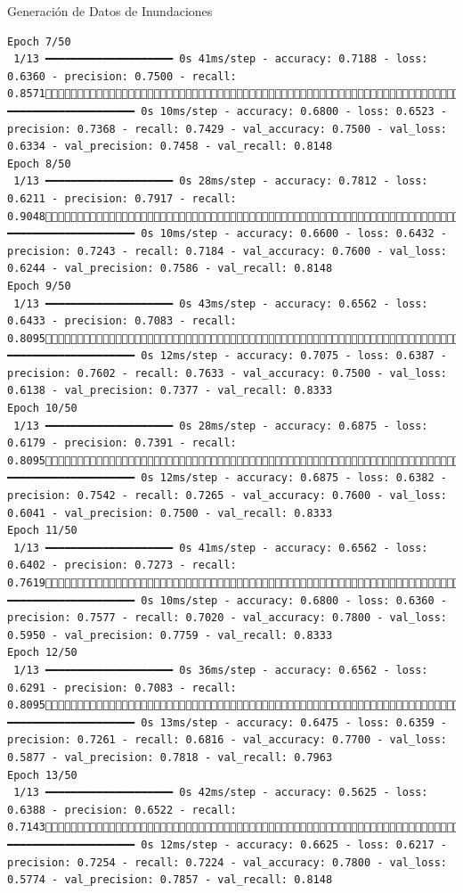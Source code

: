 \documentclass[
  ignorenonframetext,
]{beamer}
\begin{document}
\begin{frame}[fragile]{Generación de Datos de Inundaciones}
\begin{verbatim}
Epoch 7/50
 1/13 ━━━━━━━━━━━━━━━━━━━━ 0s 41ms/step - accuracy: 0.7188 - loss: 0.6360 - precision: 0.7500 - recall: 0.857113/13 ━━━━━━━━━━━━━━━━━━━━ 0s 10ms/step - accuracy: 0.6800 - loss: 0.6523 - precision: 0.7368 - recall: 0.7429 - val_accuracy: 0.7500 - val_loss: 0.6334 - val_precision: 0.7458 - val_recall: 0.8148
Epoch 8/50
 1/13 ━━━━━━━━━━━━━━━━━━━━ 0s 28ms/step - accuracy: 0.7812 - loss: 0.6211 - precision: 0.7917 - recall: 0.904813/13 ━━━━━━━━━━━━━━━━━━━━ 0s 10ms/step - accuracy: 0.6600 - loss: 0.6432 - precision: 0.7243 - recall: 0.7184 - val_accuracy: 0.7600 - val_loss: 0.6244 - val_precision: 0.7586 - val_recall: 0.8148
Epoch 9/50
 1/13 ━━━━━━━━━━━━━━━━━━━━ 0s 43ms/step - accuracy: 0.6562 - loss: 0.6433 - precision: 0.7083 - recall: 0.809513/13 ━━━━━━━━━━━━━━━━━━━━ 0s 12ms/step - accuracy: 0.7075 - loss: 0.6387 - precision: 0.7602 - recall: 0.7633 - val_accuracy: 0.7500 - val_loss: 0.6138 - val_precision: 0.7377 - val_recall: 0.8333
Epoch 10/50
 1/13 ━━━━━━━━━━━━━━━━━━━━ 0s 28ms/step - accuracy: 0.6875 - loss: 0.6179 - precision: 0.7391 - recall: 0.809513/13 ━━━━━━━━━━━━━━━━━━━━ 0s 12ms/step - accuracy: 0.6875 - loss: 0.6382 - precision: 0.7542 - recall: 0.7265 - val_accuracy: 0.7600 - val_loss: 0.6041 - val_precision: 0.7500 - val_recall: 0.8333
Epoch 11/50
 1/13 ━━━━━━━━━━━━━━━━━━━━ 0s 41ms/step - accuracy: 0.6562 - loss: 0.6402 - precision: 0.7273 - recall: 0.761913/13 ━━━━━━━━━━━━━━━━━━━━ 0s 10ms/step - accuracy: 0.6800 - loss: 0.6360 - precision: 0.7577 - recall: 0.7020 - val_accuracy: 0.7800 - val_loss: 0.5950 - val_precision: 0.7759 - val_recall: 0.8333
Epoch 12/50
 1/13 ━━━━━━━━━━━━━━━━━━━━ 0s 36ms/step - accuracy: 0.6562 - loss: 0.6291 - precision: 0.7083 - recall: 0.809513/13 ━━━━━━━━━━━━━━━━━━━━ 0s 13ms/step - accuracy: 0.6475 - loss: 0.6359 - precision: 0.7261 - recall: 0.6816 - val_accuracy: 0.7700 - val_loss: 0.5877 - val_precision: 0.7818 - val_recall: 0.7963
Epoch 13/50
 1/13 ━━━━━━━━━━━━━━━━━━━━ 0s 42ms/step - accuracy: 0.5625 - loss: 0.6388 - precision: 0.6522 - recall: 0.714313/13 ━━━━━━━━━━━━━━━━━━━━ 0s 12ms/step - accuracy: 0.6625 - loss: 0.6217 - precision: 0.7254 - recall: 0.7224 - val_accuracy: 0.7800 - val_loss: 0.5774 - val_precision: 0.7857 - val_recall: 0.8148

\end{verbatim}
\end{frame}
\end{document}

